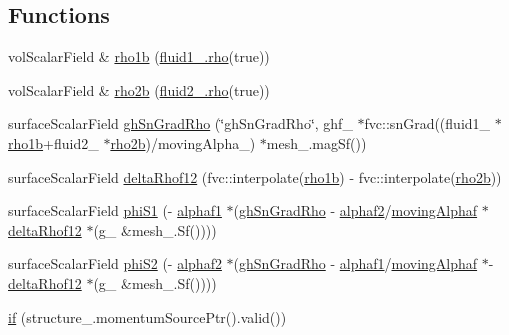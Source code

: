\subsection*{Functions}
\begin{DoxyCompactItemize}
\item 
vol\+Scalar\+Field \& \hyperlink{calcPhiS__2p_8H_a91d1f9ec51e6b9a48a4e138602396604}{rho1b} (\hyperlink{EEqn__1pl_8H_ac955f87ac2b79f02f420cae087fc52b1}{fluid1\+\_\+.\+rho}(true))
\item 
vol\+Scalar\+Field \& \hyperlink{calcPhiS__2p_8H_a05007b79f2d136ddfa62517a751f3d7a}{rho2b} (\hyperlink{EEqn__1pl_8H_ac955f87ac2b79f02f420cae087fc52b1}{fluid2\+\_\+.\+rho}(true))
\item 
surface\+Scalar\+Field \hyperlink{calcPhiS__2p_8H_a927b6934c2b9e9cfe771d567c3e748c3}{gh\+Sn\+Grad\+Rho} (\char`\"{}gh\+Sn\+Grad\+Rho\char`\"{}, ghf\+\_\+ $\ast$fvc\+::sn\+Grad((fluid1\+\_\+ $\ast$\hyperlink{calcPhiS__2p_8H_a91d1f9ec51e6b9a48a4e138602396604}{rho1b}+fluid2\+\_\+ $\ast$\hyperlink{calcPhiS__2p_8H_a05007b79f2d136ddfa62517a751f3d7a}{rho2b})/moving\+Alpha\+\_\+) $\ast$mesh\+\_\+.\+mag\+Sf())
\item 
surface\+Scalar\+Field \hyperlink{calcPhiS__2p_8H_a6acd4b60e5a0c44877d5ee8e018d1084}{delta\+Rhof12} (fvc\+::interpolate(\hyperlink{calcPhiS__2p_8H_a91d1f9ec51e6b9a48a4e138602396604}{rho1b}) -\/ fvc\+::interpolate(\hyperlink{calcPhiS__2p_8H_a05007b79f2d136ddfa62517a751f3d7a}{rho2b}))
\item 
surface\+Scalar\+Field \hyperlink{calcPhiS__2p_8H_ab7aef2692ec494c47ff7316176555687}{phi\+S1} (-\/ \hyperlink{refsAndControls__2p_8H_af5ff2b878e8d79c2bd7cf5385f55ea99}{alphaf1} $\ast$(\hyperlink{calcPhiS__2p_8H_a927b6934c2b9e9cfe771d567c3e748c3}{gh\+Sn\+Grad\+Rho} -\/ \hyperlink{refsAndControls__2p_8H_afc54ce6b2d45999d802074c7c4d86cc8}{alphaf2}/\hyperlink{refsAndControls__2p_8H_a698564459013ee34ed0ecc1254f98096}{moving\+Alphaf} $\ast$\hyperlink{calcPhiS__2p_8H_a6acd4b60e5a0c44877d5ee8e018d1084}{delta\+Rhof12} $\ast$(g\+\_\+ \&mesh\+\_\+.\+Sf())))
\item 
surface\+Scalar\+Field \hyperlink{calcPhiS__2p_8H_ab15d155ef00d6329248c6e0c70ff2f66}{phi\+S2} (-\/ \hyperlink{refsAndControls__2p_8H_afc54ce6b2d45999d802074c7c4d86cc8}{alphaf2} $\ast$(\hyperlink{calcPhiS__2p_8H_a927b6934c2b9e9cfe771d567c3e748c3}{gh\+Sn\+Grad\+Rho} -\/ \hyperlink{refsAndControls__2p_8H_af5ff2b878e8d79c2bd7cf5385f55ea99}{alphaf1}/\hyperlink{refsAndControls__2p_8H_a698564459013ee34ed0ecc1254f98096}{moving\+Alphaf} $\ast$-\/ \hyperlink{calcPhiS__2p_8H_a6acd4b60e5a0c44877d5ee8e018d1084}{delta\+Rhof12} $\ast$(g\+\_\+ \&mesh\+\_\+.\+Sf())))
\item 
\hyperlink{calcPhiS__2p_8H_a0f4fbab0f4b5e59997f738b1d74e0916}{if} (structure\+\_\+.\+momentum\+Source\+Ptr().valid())
\end{DoxyCompactItemize}


